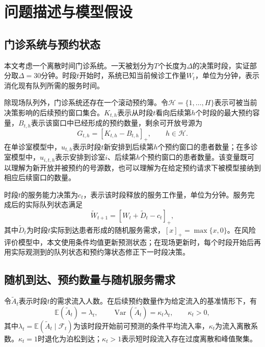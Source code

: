 \documentclass[a4paper,zihao=-4]{ctexart}
\newcommand{\E}{\mathbb{E}}
\newcommand{\Var}{\operatorname{Var}}
\numberwithin{figure}{section}
\numberwithin{table}{section}
\begin{document}
\section{问题描述与模型假设}

\subsection{门诊系统与预约状态}

本文考虑一个离散时间门诊系统。一天被划分为$T$个长度为$\Delta$的决策时段，实证部分取$\Delta=30$分钟。时段$t$开始时，系统已知当前候诊工作量$W_t$，单位为分钟，表示消化现有队列所需的服务时间。

除现场队列外，门诊系统还存在一个滚动预约簿。令$\mathcal H=\{1,\ldots,H\}$表示可被当前决策影响的后续预约窗口集合。$K_{t,h}$表示从时段$t$看向后续第$h$个时段的最大预约容量，$B_{t,h}$表示该窗口中已经形成的预约数量，剩余可开放号源为
\begin{equation}
G_{t,h}=\left[K_{t,h}-B_{t,h}\right]_+,\qquad h\in\mathcal H .
\end{equation}
在单诊室模型中，$u_{t,h}$表示时段$t$新安排到后续第$h$个预约窗口的患者数量；在多诊室模型中，$u_{i,t,h}$表示安排到诊室$i$、后续第$h$个预约窗口的患者数量。该变量既可以理解为新开放并被预约的号源数，也可以理解为在给定预约请求下被模型接纳到相应后续窗口的数量。

时段$t$的服务能力决策为$c_t$，表示该时段释放的服务工作量，单位为分钟。服务完成后的实际队列状态满足
\begin{equation}
\tilde W_{t+1}=\left[W_t+\tilde D_t-c_t\right]_+,
\label{eq:queue-dynamic}
\end{equation}
其中$\tilde D_t$为时段$t$实际到达患者形成的随机服务需求，$[x]_+=\max\{x,0\}$。在风险评价模型中，本文使用条件均值更新预测状态；在现场更新时，每个时段开始后再用实际观测到的队列状态和预约簿状态修正下一时段决策。

\subsection{随机到达、预约数量与随机服务需求}

令$\tilde A_t$表示时段$t$的需求流入人数。在后续预约数量作为给定流入的基准情形下，有
\begin{equation}
\E(\tilde A_t)=\lambda_t,\qquad
\Var(\tilde A_t)=\kappa_t\lambda_t,\qquad \kappa_t>0,
\end{equation}
其中$\lambda_t=\E(\tilde A_t\mid\mathcal F_t)$为该时段开始前可预测的条件平均流入率，$\kappa_t$为流入离散系数。$\kappa_t=1$时退化为泊松到达；$\kappa_t>1$表示短时段流入存在过度离散和峰值聚集。
\end{document}

